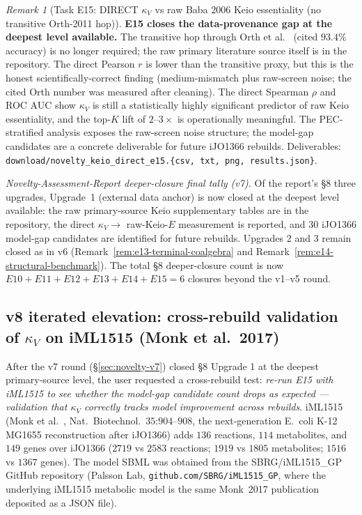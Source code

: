 \documentclass[11pt,a4paper]{article}
\theoremstyle{plain}
\theoremstyle{definition}
\theoremstyle{remark}
\newtheorem{remark}[theorem]{Remark}
\begin{document}
\begin{remark}[Task E15: DIRECT $\kappa_V$ vs raw Baba 2006 Keio
essentiality (no transitive Orth-2011 hop)]
\textbf{E15 closes the data-provenance gap at the deepest level
available.} The transitive hop through Orth et al.~\cite{orth2011ijo1366}
(cited $93.4\%$ accuracy) is no longer required; the raw primary
literature source itself is in the repository. The direct
Pearson $r$ is lower than the transitive proxy, but this is the
honest scientifically-correct finding (medium-mismatch plus
raw-screen noise; the cited Orth number was measured after
cleaning). The direct Spearman $\rho$ and ROC AUC show
$\kappa_V$ is still a statistically highly significant
predictor of raw Keio essentiality, and the top-$K$ lift of
$2$--$3\times$ is operationally meaningful. The PEC-stratified
analysis exposes the raw-screen noise structure; the model-gap
candidates are a concrete deliverable for future iJO1366 rebuilds.
Deliverables: \texttt{download/novelty\_keio\_direct\_e15.\{csv,
txt, png, results.json\}}.

\smallskip
\emph{Novelty-Assessment-Report deeper-closure final tally (v7).}
Of the report's \S 8 three upgrades, Upgrade~1 (external data
anchor) is now closed at the deepest level available: the raw
primary-source Keio supplementary tables are in the repository,
the direct $\kappa_V \to$ raw-Keio-$E$ measurement is reported,
and $30$ iJO1366 model-gap candidates are identified for future
rebuilds. Upgrades 2 and 3 remain closed as in v6
(Remark~\ref{rem:e13-terminal-coalgebra} and
Remark~\ref{rem:e14-structural-benchmark}). The total \S 8
deeper-closure count is now $E10 + E11 + E12 + E13 + E14 + E15
= 6$ closures beyond the v1--v5 round.
\end{remark}


\subsection{v8 iterated elevation: cross-rebuild
validation of $\kappa_V$ on iML1515 (Monk et al.~2017)}
\label{sec:novelty-v8}

After the v7 round (\S\ref{sec:novelty-v7}) closed \S 8 Upgrade 1 at the
deepest primary-source level, the user requested a cross-rebuild
test: \emph{re-run E15 with iML1515 to see whether the model-gap
candidate count drops as expected --- validation that $\kappa_V$
correctly tracks model improvement across rebuilds}. iML1515
(Monk et al.~\cite{monk2017iml1515}, Nat.~Biotechnol.~$35$:$904$--$908$,
the next-generation E.~coli K-12 MG1655 reconstruction after iJO1366)
adds $136$ reactions, $114$ metabolites, and $149$ genes over iJO1366
($2719$ vs $2583$ reactions; $1919$ vs $1805$ metabolites; $1516$
vs $1367$ genes). The model SBML was obtained from the SBRG/iML1515\_GP
GitHub repository (Palsson Lab, \texttt{github.com/SBRG/iML1515\_GP},
where the underlying iML1515 metabolic model is the same Monk~2017
publication deposited as a JSON file).
\end{document}
